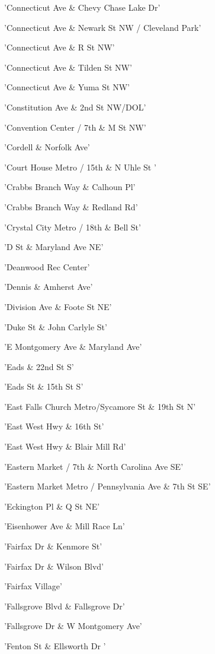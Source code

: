 \documentclass[11pt]{article}
\begin{document}
\begin{enumerate*}
\item 'Connecticut Ave \& Chevy Chase Lake Dr'
\item 'Connecticut Ave \& Newark St NW / Cleveland Park'
\item 'Connecticut Ave \& R St NW'
\item 'Connecticut Ave \& Tilden St NW'
\item 'Connecticut Ave \& Yuma St NW'
\item 'Constitution Ave \& 2nd St NW/DOL'
\item 'Convention Center / 7th \& M St NW'
\item 'Cordell \& Norfolk Ave'
\item 'Court House Metro / 15th \& N Uhle St '
\item 'Crabbs Branch Way \& Calhoun Pl'
\item 'Crabbs Branch Way \& Redland Rd'
\item 'Crystal City Metro / 18th \& Bell St'
\item 'D St \& Maryland Ave NE'
\item 'Deanwood Rec Center'
\item 'Dennis \& Amherst Ave'
\item 'Division Ave \& Foote St NE'
\item 'Duke St \& John Carlyle St'
\item 'E Montgomery Ave \& Maryland Ave'
\item 'Eads \& 22nd St S'
\item 'Eads St \& 15th St S'
\item 'East Falls Church Metro/Sycamore St \& 19th St N'
\item 'East West Hwy \& 16th St'
\item 'East West Hwy \& Blair Mill Rd'
\item 'Eastern Market / 7th \& North Carolina Ave SE'
\item 'Eastern Market Metro / Pennsylvania Ave \& 7th St SE'
\item 'Eckington Pl \& Q St NE'
\item 'Eisenhower Ave \& Mill Race Ln'
\item 'Fairfax Dr \& Kenmore St'
\item 'Fairfax Dr \& Wilson Blvd'
\item 'Fairfax Village'
\item 'Fallsgrove Blvd \& Fallsgrove Dr'
\item 'Fallsgrove Dr \& W Montgomery Ave'
\item 'Fenton St \& Ellsworth Dr '

\end{enumerate*}
\end{document}
